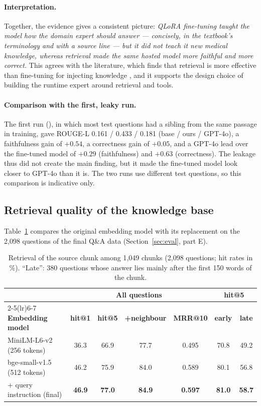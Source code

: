 \paragraph{Interpretation.} Together, the evidence gives a consistent picture: \emph{QLoRA fine-tuning taught the model how the domain expert should answer --- concisely, in the textbook's terminology and with a source line --- but it did not teach it new medical knowledge, whereas retrieval made the same hosted model more faithful and more correct.} This agrees with the literature, which finds that retrieval is more effective than fine-tuning for injecting knowledge \cite{ovadia2024}, and it supports the design choice of building the runtime expert around retrieval and tools.

\paragraph{Comparison with the first, leaky run.} The first run (), in which most test questions had a sibling from the same passage in training, gave ROUGE-L 0.161 / 0.433 / 0.181 (base / ours / GPT-4o), a faithfulness gain of $+0.54$, a correctness gain of $+0.05$, and a GPT-4o lead over the fine-tuned model of $+0.29$ (faithfulness) and $+0.63$ (correctness). The leakage thus did not create the main finding, but it made the fine-tuned model look closer to GPT-4o than it is. The two runs use different test questions, so this comparison is indicative only.

\subsection{Retrieval quality of the knowledge base}\label{sec:res-retrieval}

Table~\ref{tab:retr} compares the original embedding model with its replacement on the 2{,}098 questions of the final Q\&A data (Section~\ref{sec:eval}, part E).

\begin{table}[H]
\centering
\caption{Retrieval of the source chunk among 1{,}049 chunks (2{,}098 questions; hit rates in \%). ``Late'': 380 questions whose answer lies mainly after the first 150 words of the chunk.}
\label{tab:retr}
\small
\setlength{\tabcolsep}{4pt}
\begin{tabular}{lcccccc}
\toprule
 & \multicolumn{4}{c}{\textbf{All questions}} & \multicolumn{2}{c}{\textbf{hit@5}} \\
\cmidrule(lr){2-5}\cmidrule(lr){6-7}
\textbf{Embedding model} & \textbf{hit@1} & \textbf{hit@5} & \textbf{+neighbour} & \textbf{MRR@10} & \textbf{early} & \textbf{late} \\
\midrule
MiniLM-L6-v2 (256 tokens) & 36.3 & 66.9 & 77.7 & 0.495 & 70.8 & 49.2 \\
bge-small-v1.5 (512 tokens) & 46.2 & 75.9 & 84.0 & 0.589 & 80.1 & 56.8 \\
+ query instruction (final) & \textbf{46.9} & \textbf{77.0} & \textbf{84.9} & \textbf{0.597} & \textbf{81.0} & \textbf{58.7} \\
\bottomrule
\end{tabular}
\end{table}

